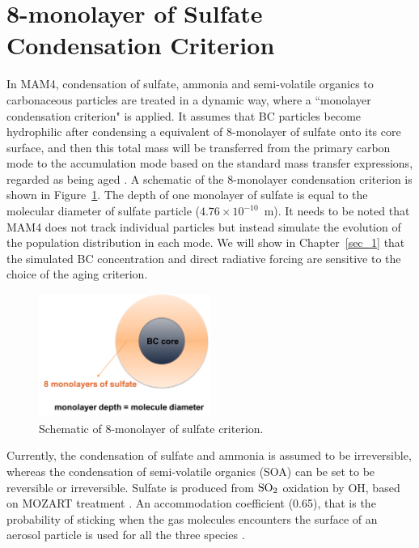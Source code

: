 \documentclass[12pt, fullpage]{uiucthesis2009}
\begin{document}
	
	\section{8-monolayer of Sulfate Condensation Criterion}\label{sec_2}
		
	In MAM4, condensation of sulfate, ammonia and semi-volatile organics to carbonaceous particles are treated in a dynamic way, where a ``monolayer condensation criterion" is applied. It assumes that BC particles become hydrophilic after condensing a equivalent of 8-monolayer of sulfate onto its core surface, and then this total mass will be transferred from the primary carbon mode to the accumulation mode based on the standard mass transfer expressions, regarded as being aged \citep{Liu2012}. A schematic of the 8-monolayer condensation criterion is shown in Figure~\ref{fig_P3}. The depth of one monolayer of sulfate is equal to the molecular diameter of sulfate particle ($4.76\times 10^{-10}$~m). It needs to be noted that MAM4 does not track individual particles but instead simulate the evolution of the population distribution in each mode. We will show in Chapter~\ref{sec_1} that the simulated BC concentration and direct radiative forcing are sensitive to the choice of the aging criterion.
	\begin{figure}[h] 
		\begin{center}
			\includegraphics[width = 0.5\textwidth]{Figure03}
			\caption[Schematic of 8-monolayer of sulfate criterion]{\label{fig_P3} Schematic of 8-monolayer of sulfate criterion.}
		\end{center}
	\end{figure}
	
	Currently, the condensation of sulfate and ammonia is assumed to be irreversible, whereas the condensation of semi-volatile organics (SOA) can be set to be reversible or irreversible. Sulfate is produced from $\rm{SO}_{2}$ oxidation by OH, based on MOZART treatment \citep{tie2001effects}. An accommodation coefficient (0.65), that is the probability of sticking when the gas molecules encounters the surface of an aerosol particle is used for all the three species \citep{Liu2012}. 
	
\end{document}
